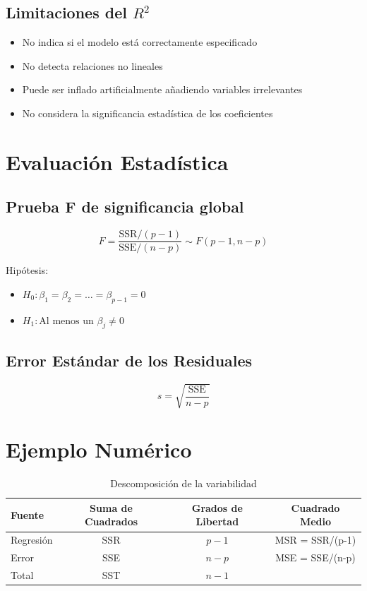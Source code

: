 \documentclass[12pt]{article}
\begin{document}
\subsection{Limitaciones del $R^2$}

\begin{itemize}
\item No indica si el modelo está correctamente especificado
\item No detecta relaciones no lineales
\item Puede ser inflado artificialmente añadiendo variables irrelevantes
\item No considera la significancia estadística de los coeficientes
\end{itemize}

\section{Evaluación Estadística}

\subsection{Prueba F de significancia global}

\[
F = \frac{\text{SSR}/(p-1)}{\text{SSE}/(n-p)} \sim F(p-1, n-p)
\]

Hipótesis:
\begin{itemize}
\item $H_0: \beta_1 = \beta_2 = \dots = \beta_{p-1} = 0$
\item $H_1: \text{Al menos un } \beta_j \neq 0$
\end{itemize}

\subsection{Error Estándar de los Residuales}

\[
s = \sqrt{\frac{\text{SSE}}{n-p}}
\]

\section{Ejemplo Numérico}

\begin{table}[h]
\centering
\caption{Descomposición de la variabilidad}
\begin{tabular}{lccc}
\toprule
Fuente & Suma de Cuadrados & Grados de Libertad & Cuadrado Medio \\
\midrule
Regresión & SSR & $p-1$ & MSR = SSR/(p-1) \\
Error & SSE & $n-p$ & MSE = SSE/(n-p) \\
Total & SST & $n-1$ & \\
\bottomrule
\end{tabular}
\end{table}
\end{document}
